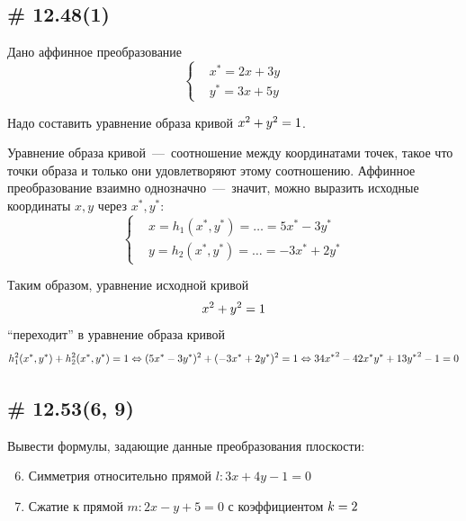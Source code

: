 \documentclass[a4paper,12pt]{article}
\begin{document}
  
  \subsection{\# 12.48(1)}
  
  Дано аффинное преобразование
  \[
    \left\{
      \begin{aligned}
        &x^* = 2x + 3y\\
        &y^* = 3x + 5y
      \end{aligned}
    \right.
  \]
  
  Надо составить уравнение образа кривой $x^2 \hm+ y^2 \hm= 1$.
  
  \begin{solution}
    Уравнение образа кривой~---~соотношение между координатами точек, такое что точки образа и только они удовлетворяют этому соотношению.
    Аффинное преобразование взаимно однозначно~---~значит, можно выразить исходные координаты $x, y$ через $x^*, y^*$:
    \[
      \left\{
        \begin{aligned}
          &x = h_1(x^*, y^*) = \ldots = 5x^* - 3y^*\\
          &y = h_2(x^*, y^*) = \ldots = -3x^* + 2y^*
        \end{aligned}
      \right.
    \]
    
    Таким образом, уравнение исходной кривой
    \[
      x^2 + y^2 \hm= 1
    \]
    ``переходит'' в уравнение образа кривой
    \[
      h_1^2(x^*, y^*) + h_2^2(x^*, y^*) \hm= 1
        \Leftrightarrow (5x^* - 3y^*)^2 + (-3x^* + 2y^*)^2 = 1
        \Leftrightarrow {34x^*}^2 - 42x^*y^* + {13y^*}^2 - 1 = 0
    \]
  \end{solution}
  
  
  \subsection{\# 12.53(6, 9)}
  
  Вывести формулы, задающие данные преобразования плоскости:
  \begin{enumerate}
    \setcounter{enumi}{5}
    
    \item Симметрия относительно прямой $l\colon 3x + 4y - 1 = 0$
    
    \setcounter{enumi}{7}
    
    \item Сжатие к прямой $m\colon 2x - y + 5 = 0$ с коэффициентом $k \hm= 2$
  \end{enumerate}
  
\end{document}
